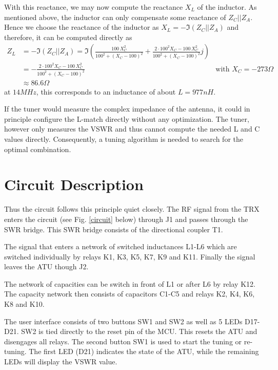 \documentclass[10pt, a4paper,twoside]{scrartcl}
\begin{document}
With this reactance, we may now compute the reactance $X_L$ of the inductor. As mentioned above, the inductor can only compensate some reactance of $Z_C||Z_A$. Hence we choose the reactance of the inductor as $X_L = -\mathfrak{I}(Z_C||Z_A)$ and therefore, it can be computed directly as
\begin{align*}
 Z_L &= -\mathfrak{I}(Z_C||Z_A) = \mathfrak{I}\left(\frac{100\,X_C^2}{100^2+(X_C-100)^2} + \frac{2\cdot 100^2X_C-100\,X_C^2}{100^2+(X_C-100)^2}j\right) \\
 &= -\frac{2\cdot 100^2X_C-100\,X_C^2}{100^2+(X_C-100)^2} &\text{with }X_C = -273\Omega \\
 &\approx 86.6\Omega	
\end{align*}
at $14MHz$, this corresponds to an inductance of about $L=977nH$.

If the tuner would measure the complex impedance of the antenna, it could in principle configure the L-match directly without any optimization. The tuner, however only measures the VSWR and thus cannot compute the needed L and C values directly. Consequently, a tuning algorithm is needed to search for the optimal combination.

\section{Circuit Description}
Thus the circuit follows this principle quiet closely. The RF signal from the TRX enters the circuit (see Fig. \ref{circuit} below) through J1 and passes through the SWR bridge. This SWR bridge consists of the directional coupler T1.

The signal that enters a network of switched inductances L1-L6 which are switched individually by relays K1, K3, K5, K7, K9 and K11. Finally the signal leaves the ATU though J2. 

The network of capacities can be switch in front of L1 or after L6 by relay K12. The capacity network then consists of capacitors C1-C5 and relays K2, K4, K6, K8 and K10.

The user interface consists of two buttons SW1 and SW2 as well as 5 LEDs D17-D21. SW2 is tied directly to the reset pin of the MCU. This resets the ATU and disengages all relays. The second button SW1 is used to start the tuning or re-tuning. The first LED (D21) indicates the state of the ATU, while the remaining LEDs will display the VSWR value.


\end{document}
